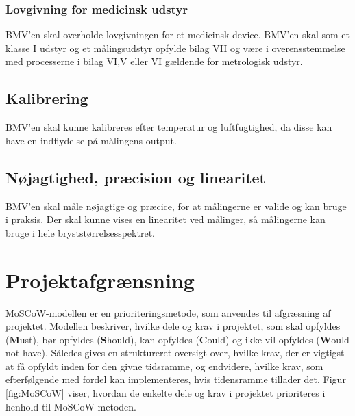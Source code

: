  		\subsubsection{Lovgivning for medicinsk udstyr}
 		BMV'en skal overholde lovgivningen for et medicinsk device. BMV'en skal som et klasse I udstyr og et målingsudstyr opfylde bilag VII og være i overensstemmelse med processerne i bilag VI,V eller VI gældende for metrologisk udstyr.
 		\subsection{Kalibrering}
 		BMV'en skal kunne kalibreres efter temperatur og luftfugtighed, da disse kan have en indflydelse på målingens output. 
 		\subsection*{Nøjagtighed, præcision og linearitet}
 		BMV'en skal måle nøjagtige og præcice, for at målingerne er valide og kan bruge i praksis. 
 		Der skal kunne vises en linearitet ved målinger, så målingerne kan bruge i hele bryststørrelsesspektret. 
	
	\pagebreak
	
	\section{Projektafgrænsning}
	MoSCoW-modellen er en prioriteringsmetode, som anvendes til afgræsning af projektet. Modellen beskriver, hvilke dele og krav i projektet, som skal opfyldes (\textbf{M}ust), bør opfyldes (\textbf{S}hould), kan opfyldes (\textbf{C}ould) og ikke vil opfyldes (\textbf{W}ould not have). Således gives en struktureret oversigt over, hvilke krav, der er vigtigst at få opfyldt inden for den givne tidsramme, og endvidere, hvilke krav, som efterfølgende med fordel kan implementeres, hvis tidensramme tillader det. Figur \ref{fig:MoSCoW} viser, hvordan de enkelte dele og krav i projektet prioriteres i henhold til MoSCoW-metoden.  
	
